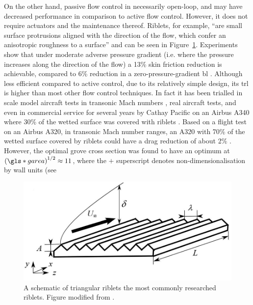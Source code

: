 On the other hand, passive flow control in necessarily open-loop, and may have decreased performance in comparison to active flow control. However, it does not require actuators and the maintenance thereof. Riblets, for example, ``are small surface protrusions aligned with the direction of the flow, which confer an anisotropic roughness to a surface'' \cite{garcia-mayoral2011} and can be seen in Figure~\ref{fig:riblets}. Experiments show that under moderate adverse pressure gradient (i.e. where the pressure increases along the direction of the flow) a 13\% skin friction reduction is achievable, compared to 6\% reduction in a zero-pressure-gradient \gls{bl} \cite{debisschop1996}. Although less efficient compared to active control, due to its relatively simple design, its \gls{trl} is higher than most other flow control techniques. In fact it has been trialled in scale model aircraft tests in transonic Mach numbers \cite{coustols1990}, real aircraft tests, and even in commercial service for several years by Cathay Pacific on an Airbus A340 where 30\% of the wetted surface was covered with riblets \cite{bechert2006}. Based on a flight test on an Airbus A320, in transonic Mach number ranges, an A320 with 70\% of the wetted surface covered by riblets could have a drag reduction of about 2\% \cite{szodruch1991}. However, the optimal grove cross section was found to have an optimum at $\left(\gls*{garea}\right)^{1 /2}\approx11$, where the $+$ superscript denotes non-dimensionalisation by wall units (see %

\begin{figure}[htbp]
\centering
\includegraphics[width=0.5\linewidth]{introduction/fig/riblets.jpeg}
\caption{A schematic of triangular riblets the most commonly researched riblets. Figure modified from \cite{raayai-ardakani2019}.}
\label{fig:riblets}
\end{figure}

